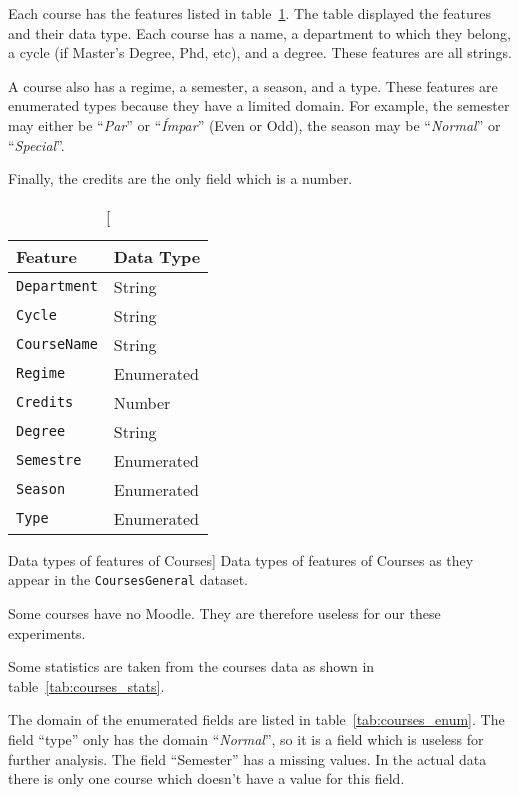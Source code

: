 Each course has the features listed in
table~\ref{tab:courses_general_features}. The table displayed the features and
their data type. Each course has a name, a department to which they belong, a
cycle (if Master's Degree, Phd, etc), and a degree. These features are all
strings.

A course also has a regime, a semester, a season, and a type. These features
are enumerated types because they have a limited domain. For example, the
semester may either be ``\textit{Par}'' or ``\textit{Ímpar}'' (Even or Odd),
the season may be ``\textit{Normal}'' or ``\textit{Special}''.

Finally, the credits are the only field which is a number.

\begin{table}[h!]
    \centering

    \begin{tabular}{l l}
        Feature             & Data Type  \\ \hline
        \texttt{Department} & String     \\
        \texttt{Cycle}      & String     \\
        \texttt{CourseName} & String     \\
        \texttt{Regime}     & Enumerated \\
        \texttt{Credits}    & Number     \\
        \texttt{Degree}     & String     \\
        \texttt{Semestre}   & Enumerated \\
        \texttt{Season}     & Enumerated \\
        \texttt{Type}       & Enumerated \\
    \end{tabular}

    \caption
        [Data types of features of Courses]
        {Data types of features of Courses as they appear in the
        \texttt{CoursesGeneral} dataset.}

    \label{tab:courses_general_features}
\end{table}

Some courses have no Moodle. They are therefore useless for our these
experiments.

Some statistics are taken from the courses data as shown in
table~\ref{tab:courses_stats}.

The domain of the enumerated fields are listed in table~\ref{tab:courses_enum}.
The field ``type'' only has the domain ``\textit{Normal}'', so it is a field
which is useless for further analysis. The field ``Semester'' has a missing
values. In the actual data there is only one course which doesn't have a value
for this field.

